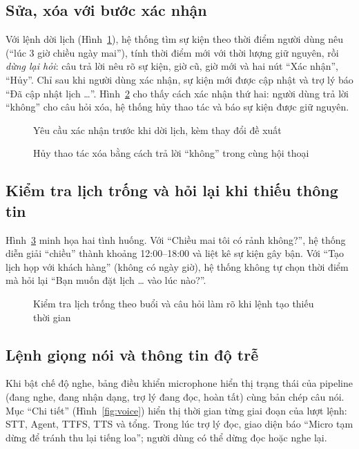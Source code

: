 \subsection{Sửa, xóa với bước xác nhận}
Với lệnh dời lịch (Hình~\ref{fig:update-confirm}), hệ thống tìm sự kiện theo thời điểm người dùng nêu (“lúc 3 giờ chiều ngày mai”), tính thời điểm mới với thời lượng giữ nguyên, rồi \textit{dừng lại hỏi}: câu trả lời nêu rõ sự kiện, giờ cũ, giờ mới và hai nút “Xác nhận”, “Hủy”. Chỉ sau khi người dùng xác nhận, sự kiện mới được cập nhật và trợ lý báo “Đã cập nhật lịch \ldots”. Hình~\ref{fig:delete-rejected} cho thấy cách xác nhận thứ hai: người dùng trả lời “không” cho câu hỏi xóa, hệ thống hủy thao tác và báo sự kiện được giữ nguyên.

\begin{figure}[!htbp]
\centering
{}
\caption{Yêu cầu xác nhận trước khi dời lịch, kèm thay đổi đề xuất}\label{fig:update-confirm}
\end{figure}

\begin{figure}[!htbp]
\centering
{}
\caption{Hủy thao tác xóa bằng cách trả lời “không” trong cùng hội thoại}\label{fig:delete-rejected}
\end{figure}

\subsection{Kiểm tra lịch trống và hỏi lại khi thiếu thông tin}
Hình~\ref{fig:availability} minh họa hai tình huống. Với “Chiều mai tôi có rảnh không?”, hệ thống diễn giải “chiều” thành khoảng 12:00–18:00 và liệt kê sự kiện gây bận. Với “Tạo lịch họp với khách hàng” (không có ngày giờ), hệ thống không tự chọn thời điểm mà hỏi lại “Bạn muốn đặt lịch \ldots{} vào lúc nào?”.

\begin{figure}[!htbp]
\centering
{}
\caption{Kiểm tra lịch trống theo buổi và câu hỏi làm rõ khi lệnh tạo thiếu thời gian}\label{fig:availability}
\end{figure}

\subsection{Lệnh giọng nói và thông tin độ trễ}
Khi bật chế độ nghe, bảng điều khiển microphone hiển thị trạng thái của pipeline (đang nghe, đang nhận dạng, trợ lý đang đọc, hoàn tất) cùng bản chép câu nói. Mục “Chi tiết” (Hình~\ref{fig:voice}) hiển thị thời gian từng giai đoạn của lượt lệnh: STT, Agent, TTFS, TTS và tổng. Trong lúc trợ lý đọc, giao diện báo “Micro tạm dừng để tránh thu lại tiếng loa”; người dùng có thể dừng đọc hoặc nghe lại.

